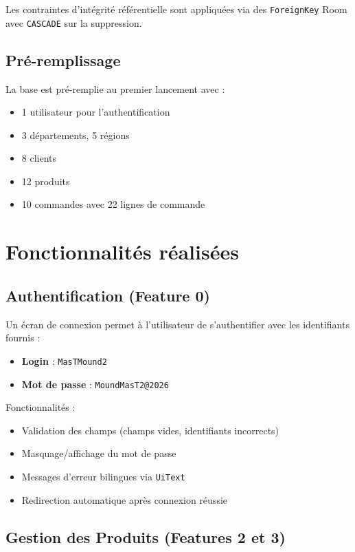 \documentclass[12pt,a4paper]{article}
\begin{document}
Les contraintes d'int\'egrit\'e r\'ef\'erentielle sont appliqu\'ees via des \texttt{ForeignKey} Room avec \texttt{CASCADE} sur la suppression.

\subsection{Pr\'e-remplissage}

La base est pr\'e-remplie au premier lancement avec :
\begin{itemize}
    \item 1 utilisateur pour l'authentification
    \item 3 d\'epartements, 5 r\'egions
    \item 8 clients
    \item 12 produits
    \item 10 commandes avec 22 lignes de commande
\end{itemize}

\section{Fonctionnalit\'es r\'ealis\'ees}

\subsection{Authentification (Feature 0)}

Un \'ecran de connexion permet \`a l'utilisateur de s'authentifier avec les identifiants fournis :
\begin{itemize}
    \item \textbf{Login} : \texttt{MasTMound2}
    \item \textbf{Mot de passe} : \texttt{MoundMasT2@2026}
\end{itemize}

Fonctionnalit\'es :
\begin{itemize}
    \item Validation des champs (champs vides, identifiants incorrects)
    \item Masquage/affichage du mot de passe
    \item Messages d'erreur bilingues via \texttt{UiText}
    \item Redirection automatique apr\`es connexion r\'eussie
\end{itemize}

\subsection{Gestion des Produits (Features 2 et 3)}
\end{document}
